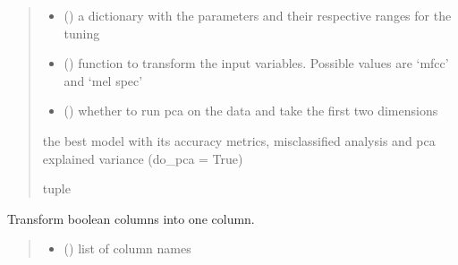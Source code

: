 \documentclass[letterpaper,10pt,english]{sphinxmanual}
\begin{document}
\begin{fulllineitems}
\begin{fulllineitems}
\begin{quote}
\begin{description}
\begin{itemize}
\item {} 
\sphinxAtStartPar
{} () \textendash{} a dictionary with the parameters and their respective ranges for the tuning

\item {} 
\sphinxAtStartPar
{} () \textendash{} function to transform the input variables. Possible values are ‘mfcc’ and ‘mel spec’

\item {} 
\sphinxAtStartPar
{} () \textendash{} whether to run pca on the data and take the first two dimensions

\end{itemize}

\sphinxAtStartPar
the best model with its accuracy metrics, misclassified analysis and pca explained variance (do\_pca = True)

\sphinxAtStartPar
tuple

\end{description}\end{quote}

\end{fulllineitems}


\begin{fulllineitems}
\label{\detokenize{BeeClassification:BeeClassification.BeeClassification.new_y_label_creation}}
\pysigstartsignatures
{}
\pysigstopsignatures
\sphinxAtStartPar
Transform boolean columns into one column.
\begin{quote}\begin{description}
\begin{itemize}
\item {} 
\sphinxAtStartPar
{} () \textendash{} list of column names


\end{itemize}
\end{description}
\end{quote}
\end{fulllineitems}
\end{fulllineitems}
\end{document}

